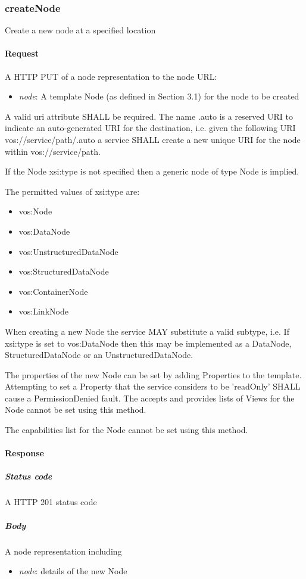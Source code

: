 \documentclass[11pt,a4paper]{ivoa}
\begin{document}
\subsubsection{createNode}
Create a new node at a specified location

\paragraph{Request}
A HTTP PUT of a node representation to the node URL:
\begin{itemize}
    \item \emph{node}: A template Node (as defined in Section 3.1) for the node to be created
\end{itemize}

A valid uri attribute SHALL be required. The name .auto is a reserved URI to indicate an auto-generated URI for the destination, i.e. given the following URI vos://service/path/.auto a service SHALL create a new unique URI for the node within vos://service/path.

If the Node xsi:type is not specified then a generic node of type Node is implied.

The permitted values of xsi:type are:

\begin{itemize}
    \item vos:Node
    \item vos:DataNode
    \item vos:UnstructuredDataNode
    \item vos:StructuredDataNode
    \item vos:ContainerNode
    \item vos:LinkNode
\end{itemize}

When creating a new Node the service MAY substitute a valid subtype, i.e. If xsi:type is set to vos:DataNode then this may be implemented as a DataNode, StructuredDataNode or an UnstructuredDataNode.

The properties of the new Node can be set by adding Properties to the template. Attempting to set a Property that the service considers to be 'readOnly' SHALL cause a PermissionDenied fault. The accepts and provides lists of Views for the Node cannot be set using this method.

The capabilities list for the Node cannot be set using this method.

\paragraph{Response}
\subparagraph{Status code} A HTTP 201 status code
\subparagraph{Body}
A node representation including
\begin{itemize}
    \item \emph{node}: details of the new Node
\end{itemize}
\end{document}
